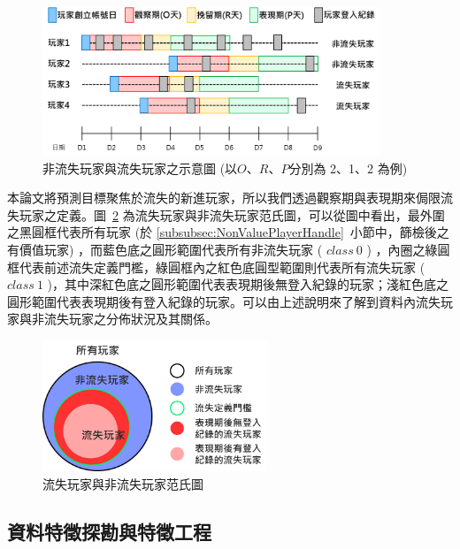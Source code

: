 \begin{figure}[!htb]
  \begin{center}
    \includegraphics[width=0.9\textwidth]{figures/Image_ClassPreparation.png}
    \caption[非流失玩家與流失玩家之示意圖]{非流失玩家與流失玩家之示意圖 (以$O$、$R$、$P$分別為 2、1、2 為例) }
    \label{fig:Image_ClassPreparation}
  \end{center}
\end{figure}

本論文將預測目標聚焦於流失的新進玩家，所以我們透過觀察期與表現期來侷限流失玩家之定義。圖~\ref{fig:Image_ClassVennChart} 為流失玩家與非流失玩家范氏圖，可以從圖中看出，最外圍之黑圓框代表所有玩家 (於 \ref{subsubsec:NonValuePlayerHandle}~小節中，篩檢後之有價值玩家) ，而藍色底之圓形範圍代表所有非流失玩家 ( $class\ 0$ ) ，內圈之綠圓框代表前述流失定義門檻，綠圓框內之紅色底圓型範圍則代表所有流失玩家 ( $class\ 1$ )，其中深紅色底之圓形範圍代表表現期後無登入紀錄的玩家；淺紅色底之圓形範圍代表表現期後有登入紀錄的玩家。可以由上述說明來了解到資料內流失玩家與非流失玩家之分佈狀況及其關係。

\begin{figure}[!htb]
  \begin{center}
    \includegraphics[width=0.6\textwidth]{figures/Image_ClassVennChart.png}
    \caption[流失玩家與非流失玩家范氏圖]{流失玩家與非流失玩家范氏圖}
    \label{fig:Image_ClassVennChart}
  \end{center}
\end{figure}

\subsection{資料特徵探勘與特徵工程}
\label{subsec:FeatureMining}

